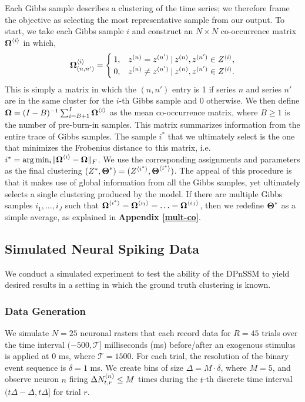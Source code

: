 \documentclass[twoside]{article}
\begin{document}
Each Gibbs sample describes a clustering of the time series; we therefore frame the objective as selecting the most representative sample from our output.  To start, we take each Gibbs sample $i$ and construct an $N \times N$ co-occurrence matrix $\baidx \Omega i$ in which, 
\begin{align}
\baidx [(n, n')] \Omega i =
\begin{cases}
1, & \idx z n = \idx z {n'} \given \idx z n, \idx z {n'} \in \aidx Z i,\\
0, & \idx z n \neq \idx z {n'} \given \idx z n, \idx z {n'} \in \aidx Z i.
\end{cases} \label{co-occurrence}
\end{align}
This is simply a matrix in which the $(n, n')$ entry is 1 if series $n$ and series $n'$ are in the same cluster for the $i$-th Gibbs sample and 0 otherwise.  {We then define {$\bd \Omega = (I-B)^{-1} \sum_{i=B+1}^I \baidx \Omega i$}} as the mean co-occurrence matrix, where $B \geq 1$ is the number of pre-burn-in samples.  This matrix summarizes information from the entire trace of Gibbs samples.  The sample $i^*$ that we ultimately select is the one that minimizes the Frobenius distance to this matrix, i.e. $i^* = \arg \min_{i} \norm{\baidx \Omega i - \bd \Omega}_F$.
We use the corresponding assignments and parameters as the final  clustering $(Z^*, \bd \Theta^*) = (\aidx Z {i^*}, \baidx \Theta {i^*})$.  The appeal of this procedure is that it makes use of global information from all the Gibbs samples, yet ultimately selects a single clustering produced by the model.  If there are multiple Gibbs samples $i_1, \ldots, i_J$ such that $\baidx \Omega {i^*} = \baidx \Omega {i_1} = \ldots = \baidx \Omega {i_J}$, then we redefine $\bd \Theta^*$ as a simple average, as explained in \textbf{Appendix \ref{mult-co}}.     

\subsection{Simulated Neural Spiking Data} \label{ssec:sim-data}
We conduct a simulated experiment to test the ability of the DPnSSM to yield desired results in a setting in which the ground truth clustering is known. 

\subsubsection{Data Generation} \label{sssec:sim-data}
We simulate $N = 25$ neuronal rasters that each record data for $R = 45$ trials over the time interval $(-500, \mathcal{T}]$ milliseconds (ms) before/after an exogenous stimulus is applied at 0 ms, where $\mathcal{T} = 1500$.  For each trial, the resolution of the binary event sequence is $\delta = 1$ ms.  We create bins of size  $\Delta =  M \cdot \delta$, where $M = 5$, and observe neuron $n$ firing $\Delta \idx[t, r] N n \leq M$ times during the $t$-th discrete time interval $(t\Delta - \Delta, t\Delta]$ for trial $r$.  
\end{document}
